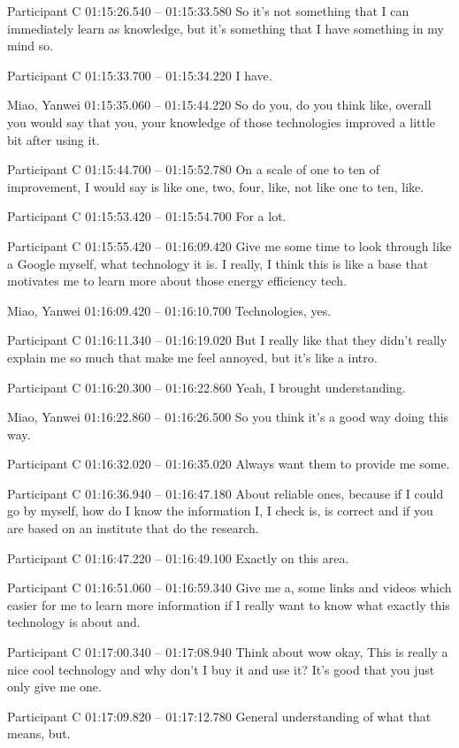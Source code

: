 {Participant C 01:15:26.540 -- 01:15:33.580
So it's not something that I can immediately learn as knowledge, but it's something that I have something in my mind so.

Participant C 01:15:33.700 -- 01:15:34.220
I have.

Miao, Yanwei 01:15:35.060 -- 01:15:44.220
So do you, do you think like, overall you would say that you, your knowledge of those technologies improved a little bit after using it.

Participant C 01:15:44.700 -- 01:15:52.780
On a scale of one to ten of improvement, I would say is like one, two, four, like, not like one to ten, like.

Participant C 01:15:53.420 -- 01:15:54.700
For a lot.

Participant C 01:15:55.420 -- 01:16:09.420
Give me some time to look through like a Google myself, what technology it is. I really, I think this is like a base that motivates me to learn more about those energy efficiency tech.

Miao, Yanwei 01:16:09.420 -- 01:16:10.700
Technologies, yes.

Participant C 01:16:11.340 -- 01:16:19.020
But I really like that they didn't really explain me so much that make me feel annoyed, but it's like a intro.

Participant C 01:16:20.300 -- 01:16:22.860
Yeah, I brought understanding.

Miao, Yanwei 01:16:22.860 -- 01:16:26.500
So you think it's a good way doing this way.

Participant C 01:16:32.020 -- 01:16:35.020
Always want them to provide me some.

Participant C 01:16:36.940 -- 01:16:47.180
About reliable ones, because if I could go by myself, how do I know the information I, I check is, is correct and if you are based on an institute that do the research.

Participant C 01:16:47.220 -- 01:16:49.100
Exactly on this area.

Participant C 01:16:51.060 -- 01:16:59.340
Give me a, some links and videos which easier for me to learn more information if I really want to know what exactly this technology is about and.

Participant C 01:17:00.340 -- 01:17:08.940
Think about wow okay, This is really a nice cool technology and why don't I buy it and use it? It's good that you just only give me one.

Participant C 01:17:09.820 -- 01:17:12.780
General understanding of what that means, but.

}
